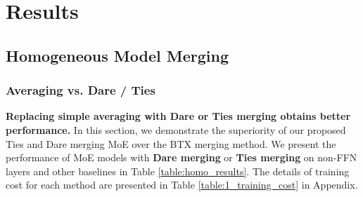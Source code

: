 \section{Results}

\subsection{Homogeneous Model Merging}

\subsubsection{Averaging vs. Dare / Ties}
\label{sec:rq1}

\textbf{Replacing simple averaging with Dare or Ties merging obtains better performance.} \quad
In this section, we demonstrate the superiority of our proposed Ties and Dare merging MoE over the BTX merging method.
We present the performance of MoE models with \textbf{Dare merging} or \textbf{Ties merging} on non-FFN layers and other baselines in Table \ref{table:homo_results}. The details of training cost for each method are presented in Table \ref{table:1_training_cost} in Appendix.

